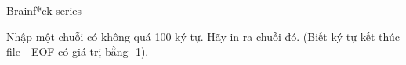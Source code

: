 Brainf*ck series     

   Nhập một chuỗi có không quá 100 ký tự. Hãy in ra chuỗi đó. (Biết ký tự kết thúc file - EOF có giá trị bằng -1).